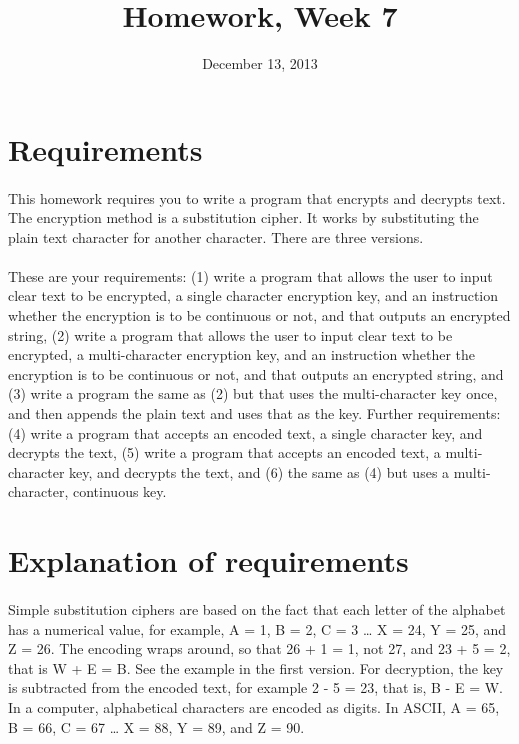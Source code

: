 \documentclass{article}
\title{Homework, Week 7}
\date{December 13, 2013}
\begin{document}
\maketitle{}

\section{Requirements}

\paragraph{}This homework requires you to write a program that encrypts and decrypts text. The encryption method is a substitution cipher. It works by substituting the plain text character for another character. There are three versions. 

\paragraph{}These are your requirements: (1) write a program that allows the user to input clear text to be encrypted, a single character encryption key, and an instruction whether the encryption is to be continuous or not, and that outputs an encrypted string, (2) write a program that allows the user to input clear text to be encrypted, a multi-character encryption key, and an instruction whether the encryption is to be continuous or not, and that outputs an encrypted string, and (3) write a program the same as (2) but that uses the multi-character key once, and then appends the plain text and uses that as the key. Further requirements: (4) write a program that accepts an encoded text, a single character key, and decrypts the text, (5) write a program that accepts an encoded text, a multi-character key, and decrypts the text, and (6) the same as (4) but uses a multi-character, continuous key.

\section{Explanation of requirements}

\paragraph{}Simple substitution ciphers are based on the fact that each letter of the alphabet has a numerical value, for example, A = 1, B = 2, C = 3 \ldots{} X = 24, Y = 25, and Z = 26. The encoding wraps around, so that 26 + 1 = 1, not 27, and 23 + 5 = 2, that is W + E = B. See the example in the first version. For decryption, the key is subtracted from the encoded text, for example 2 - 5 = 23, that is, B - E = W. In a computer, alphabetical characters are encoded as digits. In ASCII, A = 65, B = 66, C = 67 \ldots{} X = 88, Y = 89, and Z = 90. 
\end{document}
